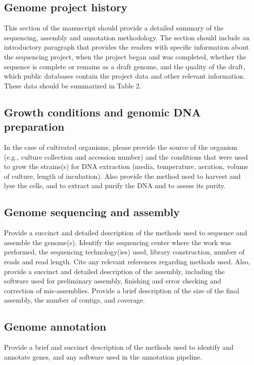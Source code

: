 \documentclass{bmcart}
\begin{document}
{\subsection*{Genome project history}
This section of the manuscript should provide a detailed summary of the sequencing, assembly and annotation methodology.  The section should include an introductory paragraph that provides the readers with specific information about the sequencing project, when the project began and was completed, whether the sequence is complete or remains as a draft genome, and the quality of the draft, which public databases contain the project data and other relevant information. These data should be summarized in Table 2.

\subsection*{Growth conditions and genomic DNA preparation}
In the case of cultivated organisms, please provide the source of the organism (e.g., culture collection and accession number) and the conditions that were used to grow the strains(s) for DNA extraction (media, temperature, aeration, volume of culture, length of incubation). Also provide the method used to harvest and lyse the cells, and to extract and purify the DNA and to assess its purity.

\subsection*{Genome sequencing and assembly}
Provide a succinct and detailed description of the methods used to sequence and assemble the genome(s). Identify the sequencing center where the work was performed, the sequencing technology(ies) used, library construction, number of reads and read length. Cite any relevant references regarding methods used. Also, provide a succinct and detailed description of the assembly, including the software used for preliminary assembly, finishing and error checking and correction of mis-assemblies.  Provide a brief description of the size of the final assembly, the number of contigs, and coverage.

\subsection*{Genome annotation}
Provide a brief and succinct description of the methods used to identify and annotate genes, and any software used in the annotation pipeline.

}
\end{document}
